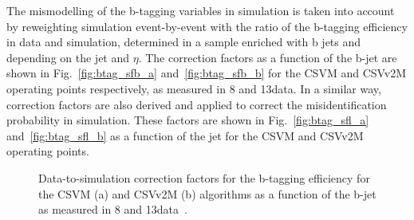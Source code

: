 \begin{table}[!htb]
\centering
\caption{B taggers and discriminator threshold used in CMS for Run~1 and Run~2 and corresponding efficiency for b jets with $\pt > 30\GeV$ in simulated \ttbar events. }
\label{tab:btagwp}
\end{table}

The mismodelling of the b-tagging variables in simulation is taken into account by reweighting simulation event-by-event with the ratio of the b-tagging efficiency in data and simulation, determined in a sample enriched with b jets and depending on the jet \pt and $\eta$. The correction factors as a function of the b-jet \pt  are shown in Fig.~\ref{fig:btag_sfb_a} and~\ref{fig:btag_sfb_b} for the CSVM and CSVv2M operating points respectively, as measured in 8 and 13\TeV data. In a similar way, correction factors are also derived and applied to correct the misidentification probability in simulation. These factors are shown in Fig.~\ref{fig:btag_sfl_a} and~\ref{fig:btag_sfl_b} as a function of the jet \pt for the CSVM and CSVv2M operating points.

\begin{figure}[!htb]
\begin{center}
\end{center} 
\caption{Data-to-simulation correction factors for the b-tagging efficiency for the CSVM (a) and CSVv2M (b) algorithms as a function of the b-jet \pt as measured in 8 and 13\TeV data~\cite{CMS:BTV13001,CMS-PAS-BTV-15-001}.}
\label{fig:btag_sfb}
\end{figure}

